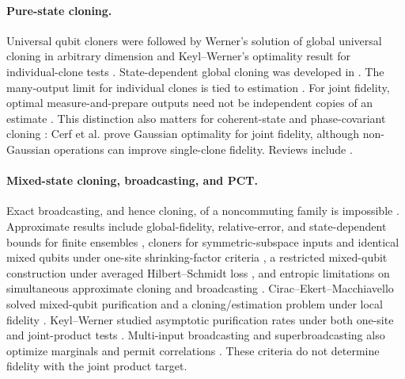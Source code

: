 \documentclass[11pt]{article}
\theoremstyle{remark}
\theoremstyle{plain}
\begin{document}
\paragraph{Pure-state cloning.}
Universal qubit cloners
\cite{BuzekHillery1996,GisinMassar1997,
BrussDiVincenzoEkertFuchsMacchiavelloSmolin1998} were followed by Werner's
solution of global universal cloning in arbitrary dimension
\cite{Werner1998} and Keyl--Werner's optimality result for individual-clone
tests \cite{KeylWerner1999}.  State-dependent global cloning was developed
in \cite{BrussDiVincenzoEkertFuchsMacchiavelloSmolin1998,CheflesBarnett1999}.
The many-output limit for individual clones is tied to estimation
\cite{MassarPopescu1995,BrussEkertMacchiavello1998,BaeAcin2006,
ChiribellaDAriano2006}.  For joint fidelity, optimal measure-and-prepare
outputs need not be independent copies of an estimate
\cite{ChiribellaYang2014Optimal}.
This distinction also matters for coherent-state and phase-covariant cloning
\cite{CerfKrugerNavezWernerWolf2005,KimChitambar2022}: Cerf et al. prove
Gaussian optimality for joint fidelity, although non-Gaussian operations
can improve single-clone fidelity.  Reviews include
\cite{ScaraniIblisdirGisinAcin2005,Chiribella2011EstimationCloning,
FanWangJingYueShiZhangMu2014}.

\paragraph{Mixed-state cloning, broadcasting, and PCT.}
Exact broadcasting, and hence cloning, of a noncommuting family is
impossible \cite{BarnumCavesFuchsJozsaSchumacher1996,KalevHen2008}.
Approximate results include global-fidelity, relative-error, and
state-dependent bounds for finite ensembles
\cite{Rastegin2003Upper,Rastegin2002Relative,Rastegin2003StateDependent},
cloners for symmetric-subspace inputs and identical mixed qubits under
one-site shrinking-factor criteria \cite{Fan2003,FanLiuShi2007}, a
restricted mixed-qubit construction under averaged Hilbert--Schmidt loss
\cite{Kazakov2007}, and entropic limitations on simultaneous approximate
cloning and broadcasting \cite{LemmWilde2017}.
Cirac--Ekert--Macchiavello solved mixed-qubit purification and a
cloning/estimation problem under local fidelity
\cite{CiracEkertMacchiavello1999}.  Keyl--Werner studied asymptotic
purification rates under both one-site and joint-product tests
\cite{KeylWerner2001Purification}.  Multi-input broadcasting and
superbroadcasting also optimize marginals and permit correlations
\cite{DArianoMacchiavelloPerinotti2005,
BuscemiDArianoMacchiavelloPerinotti2005Optimal,
BuscemiDArianoMacchiavelloPerinotti2006,DangFan2007}. These criteria do not
determine fidelity with the joint product target.
\end{document}
